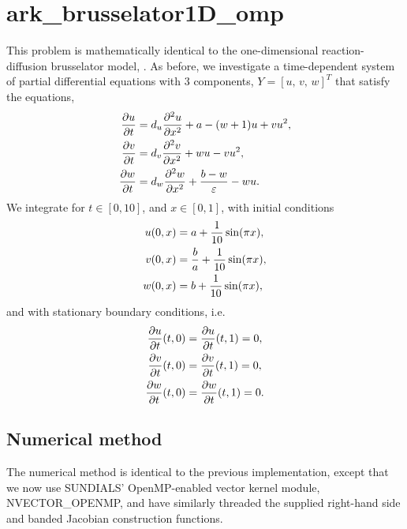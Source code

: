 \documentclass[letterpaper,10pt,english]{sphinxmanual}
\begin{document}
\section{ark\_brusselator1D\_omp}
\label{c_openmp:ark-brusselator1d-omp}\label{c_openmp:id1}
This problem is mathematically identical to the one-dimensional
reaction-diffusion brusselator model, {\hyperref[c_serial:ark-brusselator1d]{\emph{}}}.  As
before, we investigate a time-dependent system of partial differential
equations with 3 components, \(Y = [u,\, v,\, w]^T\) that satisfy
the equations,
\begin{gather}
\begin{split}\frac{\partial u}{\partial t} &= d_u \frac{\partial^2 u}{\partial
   x^2} + a - (w+1) u + v u^2, \\
\frac{\partial v}{\partial t} &= d_v \frac{\partial^2 v}{\partial
   x^2} + w u - v u^2, \\
\frac{\partial w}{\partial t} &= d_w \frac{\partial^2 w}{\partial
   x^2} + \frac{b-w}{\varepsilon} - w u.\end{split}\notag
\end{gather}
We integrate for \(t \in [0, 10]\), and \(x \in [0, 1]\), with
initial conditions
\begin{gather}
\begin{split}u(0,x) &=  a + \frac{1}{10} \sin(\pi x),\\
v(0,x) &= \frac{b}{a} + \frac{1}{10}\sin(\pi x),\\
w(0,x) &=  b + \frac{1}{10}\sin(\pi x),\end{split}\notag
\end{gather}
and with stationary boundary conditions, i.e.
\begin{gather}
\begin{split}\frac{\partial u}{\partial t}(t,0) &= \frac{\partial u}{\partial t}(t,1) = 0,\\
\frac{\partial v}{\partial t}(t,0) &= \frac{\partial v}{\partial t}(t,1) = 0,\\
\frac{\partial w}{\partial t}(t,0) &= \frac{\partial w}{\partial t}(t,1) = 0.\end{split}\notag
\end{gather}

\subsection{Numerical method}
\label{c_openmp:numerical-method}
The numerical method is identical to the previous implementation,
except that we now use SUNDIALS' OpenMP-enabled vector kernel module,
NVECTOR\_OPENMP, and have similarly threaded the supplied right-hand
side and banded Jacobian construction functions.
\end{document}
